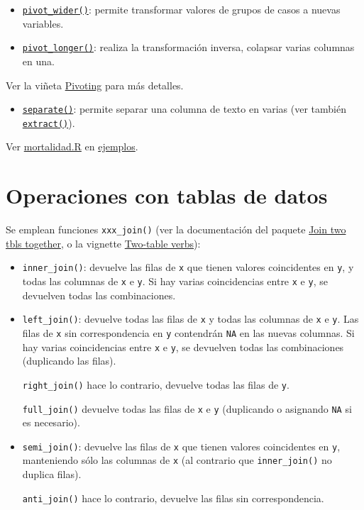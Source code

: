 \documentclass[
]{book}
\providecommand{\tightlist}{%
  \setlength{\itemsep}{0pt}\setlength{\parskip}{0pt}}
\begin{document}
\begin{itemize}
\tightlist
\item
  \href{https://tidyr.tidyverse.org/reference/pivot_wider.html}{\texttt{pivot\_wider()}}: permite transformar valores de grupos de casos a nuevas variables.
\item
  \href{https://tidyr.tidyverse.org/reference/pivot_longer.html}{\texttt{pivot\_longer()}}: realiza la transformación inversa, colapsar varias columnas en una.
\end{itemize}

Ver la viñeta \href{https://tidyr.tidyverse.org/articles/pivot.html}{Pivoting} para más detalles.

\begin{itemize}
\tightlist
\item
  \href{https://tidyr.tidyverse.org/reference/separate.html}{\texttt{separate()}}: permite separar una columna de texto en varias (ver también \href{https://tidyr.tidyverse.org/reference/extract.html}{\texttt{extract()}}).
\end{itemize}

Ver \href{ejemplos/mortalidad/mortalidad.R}{mortalidad.R} en \href{https://github.com/rubenfcasal/book_notasr/tree/main/ejemplos}{ejemplos}.

\section{Operaciones con tablas de datos}\label{dplyr-join}

Se emplean funciones \texttt{xxx\_join()} (ver la documentación del paquete
\href{https://dplyr.tidyverse.org/reference/join.html}{Join two tbls together},
o la vignette \href{https://dplyr.tidyverse.org/articles/two-table.html}{Two-table verbs}):

\begin{itemize}
\item
  \texttt{inner\_join()}: devuelve las filas de \texttt{x} que tienen valores coincidentes en \texttt{y},
  y todas las columnas de \texttt{x} e \texttt{y}. Si hay varias coincidencias entre \texttt{x} e \texttt{y},
  se devuelven todas las combinaciones.
\item
  \texttt{left\_join()}: devuelve todas las filas de \texttt{x} y todas las columnas de \texttt{x} e \texttt{y}.
  Las filas de \texttt{x} sin correspondencia en \texttt{y} contendrán \texttt{NA} en las nuevas columnas.
  Si hay varias coincidencias entre \texttt{x} e \texttt{y}, se devuelven todas las combinaciones
  (duplicando las filas).

  \texttt{right\_join()} hace lo contrario, devuelve todas las filas de \texttt{y}.

  \texttt{full\_join()} devuelve todas las filas de \texttt{x} e \texttt{y} (duplicando o asignando \texttt{NA} si es necesario).
\item
  \texttt{semi\_join()}: devuelve las filas de \texttt{x} que tienen valores coincidentes en \texttt{y},
  manteniendo sólo las columnas de \texttt{x} (al contrario que \texttt{inner\_join()} no duplica filas).

  \texttt{anti\_join()} hace lo contrario, devuelve las filas sin correspondencia.
\end{itemize}
\end{document}
